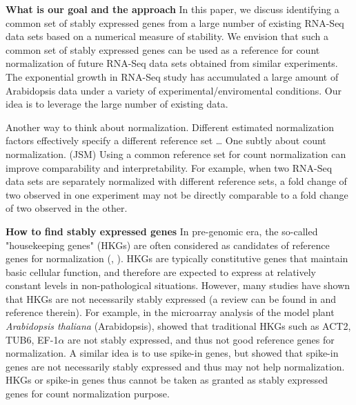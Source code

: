 \documentclass[11pt, a4paper]{article}
\begin{document}
\textbf{What is our goal and the approach} 
In this paper, we discuss identifying a common set of stably expressed genes
from a large number of  existing RNA-Seq data sets based on a numerical measure
of stability.  We envision that such a common set of stably expressed genes
can be used as a reference for count normalization of future RNA-Seq data sets
obtained from similar experiments. The exponential growth in RNA-Seq study has
accumulated a large amount of Arabidopsis data under a variety of
experimental/enviromental conditions. Our idea is to leverage the large number
of existing data.


Another way to think about normalization. Different estimated normalization
factors effectively specify a different reference set \ldots
One subtly about count normalization. (JSM)
Using a common reference set for count normalization can improve comparability
and interpretability.  For example, when two RNA-Seq data sets are separately
normalized with different reference sets, a fold change of two observed in one
experiment may not be directly comparable to a fold change of two observed in
the other. 



\textbf{How to find stably expressed genes}
In pre-genomic era, the so-called "housekeeping genes" (HKGs) are
often considered as candidates of reference genes for normalization (\cite{bustin2002quantification}, \cite{andersen2004normalization}). HKGs are
typically constitutive genes that maintain basic cellular function, and
therefore are expected to express at relatively constant levels in
non-pathological situations.  However, many studies have shown that HKGs are
not necessarily stably expressed (a review can be found in
\cite{huggett2005real} and reference therein).  For example, in the microarray
analysis of the model plant \textit{Arabidopsis thaliana} (Arabidopsis),
\cite{czechowski2005genome} showed that traditional HKGs such as ACT2, TUB6,
EF-1$\alpha$ are not stably expressed, and thus not good reference genes for
normalization.  A similar idea is to use spike-in genes, but
\cite{risso2014nat} showed that spike-in genes are not necessarily stably
expressed and thus may not help normalization.  HKGs or spike-in genes thus
cannot be taken as granted as stably expressed genes for count normalization
purpose.
 
\end{document}
